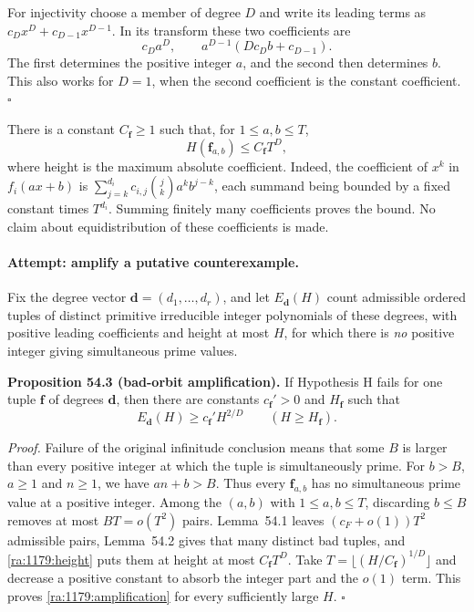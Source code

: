 \documentclass[11pt]{article}
\begin{document}
For injectivity choose a member of degree $D$ and write its leading
terms as $c_Dx^D+c_{D-1}x^{D-1}$. In its transform these two coefficients
are
\[
 c_Da^D,\qquad a^{D-1}(D c_D b+c_{D-1}).
\]
The first determines the positive integer $a$, and the second then
determines $b$. This also works for $D=1$, when the second coefficient
is the constant coefficient. \hfill$\square$

There is a constant $C_{\mathbf f}\ge1$ such that, for $1\le a,b\le T$,
\begin{equation}\label{ra:1179:height}
 H(\mathbf f_{a,b})\le C_{\mathbf f}T^D,
\end{equation}
where height is the maximum absolute coefficient. Indeed, the coefficient
of $x^k$ in $f_i(ax+b)$ is
$\sum_{j=k}^{d_i}c_{i,j}\binom jk a^k b^{j-k}$, each summand being
bounded by a fixed constant times $T^{d_i}$. Summing finitely many
coefficients proves the bound. No claim about equidistribution of these
coefficients is made.

\paragraph{Attempt: amplify a putative counterexample.}
Fix the degree vector $\mathbf d=(d_1,\ldots,d_r)$, and let
$E_{\mathbf d}(H)$ count admissible ordered tuples of distinct primitive
irreducible integer polynomials of these degrees, with positive leading
coefficients and height at most $H$, for which there is \emph{no}
positive integer giving simultaneous prime values.

\textbf{Proposition 54.3 (bad-orbit amplification).} If Hypothesis H
fails for one tuple $\mathbf f$ of degrees $\mathbf d$, then there are
constants $c_{\mathbf f}'>0$ and $H_{\mathbf f}$ such that
\begin{equation}\label{ra:1179:amplification}
 E_{\mathbf d}(H)\ge c_{\mathbf f}'H^{2/D}
 \qquad(H\ge H_{\mathbf f}).
\end{equation}

\textit{Proof.} Failure of the original infinitude conclusion means
that some $B$ is larger than every positive integer at which the tuple
is simultaneously prime. For $b>B$, $a\ge1$ and $n\ge1$, we have
$an+b>B$. Thus every $\mathbf f_{a,b}$ has no simultaneous prime value
at a positive integer. Among the $(a,b)$ with $1\le a,b\le T$, discarding
$b\le B$ removes at most $BT=o(T^2)$ pairs. Lemma~54.1 leaves
$(c_F+o(1))T^2$ admissible pairs, Lemma~54.2 gives that many distinct
bad tuples, and \eqref{ra:1179:height} puts them at height at most
$C_{\mathbf f}T^D$. Take
$T=\lfloor(H/C_{\mathbf f})^{1/D}\rfloor$ and decrease a positive
constant to absorb the integer part and the $o(1)$ term. This proves
\eqref{ra:1179:amplification} for every sufficiently large $H$.
\hfill$\square$
\end{document}

